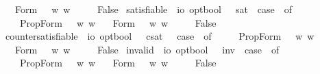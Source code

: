 \begin{isabellebody}
\ \ {\isacharbar}\ Form\ {\isasympsi}\ {\isasymRightarrow}\ {\isasymforall}w{\isachardot}{\isacharparenleft}{\isasympsi}\ w{\isacharparenright}\isanewline
\ \ {\isacharbar}\ {\isacharunderscore}\ {\isasymRightarrow}\ False{\isachardoublequoteclose}\isanewline
{}\isamarkupfalse%
\ satisfiable\ {\isacharcolon}{\isacharcolon}\ {\isachardoublequoteopen}io\ opt{\isasymRightarrow}bool{\isachardoublequoteclose}\ \ \ {\isachardoublequoteopen}{\isacharbrackleft}{\isasymphi}{\isacharbrackright}\isactrlsup s\isactrlsup a\isactrlsup t\ {\isasymequiv}\ case\ {\isasymphi}\ of\ \isanewline
\ \ \ \ PropForm\ {\isasympsi}\ {\isasymRightarrow}\ {\isasymexists}w{\isachardot}{\isacharparenleft}{\isasympsi}\ w{\isacharparenright}\isanewline
\ \ {\isacharbar}\ Form\ {\isasympsi}\ {\isasymRightarrow}\ {\isasymexists}w{\isachardot}{\isacharparenleft}{\isasympsi}\ w{\isacharparenright}\isanewline
\ \ {\isacharbar}\ {\isacharunderscore}\ {\isasymRightarrow}\ False{\isachardoublequoteclose}\isanewline
{}\isamarkupfalse%
\ countersatisfiable\ {\isacharcolon}{\isacharcolon}\ {\isachardoublequoteopen}io\ opt{\isasymRightarrow}bool{\isachardoublequoteclose}\ \ \ {\isachardoublequoteopen}{\isacharbrackleft}{\isasymphi}{\isacharbrackright}\isactrlsup c\isactrlsup s\isactrlsup a\isactrlsup t\ {\isasymequiv}\ \ case\ {\isasymphi}\ of\ \isanewline
\ \ \ \ PropForm\ {\isasympsi}\ {\isasymRightarrow}\ {\isasymexists}w{\isachardot}{\isasymnot}{\isacharparenleft}{\isasympsi}\ w{\isacharparenright}\isanewline
\ \ {\isacharbar}\ Form\ {\isasympsi}\ {\isasymRightarrow}\ {\isasymexists}w{\isachardot}{\isasymnot}{\isacharparenleft}{\isasympsi}\ w{\isacharparenright}\isanewline
\ \ {\isacharbar}\ {\isacharunderscore}\ {\isasymRightarrow}\ False{\isachardoublequoteclose}\isanewline
{}\isamarkupfalse%
\ invalid\ {\isacharcolon}{\isacharcolon}\ {\isachardoublequoteopen}io\ opt{\isasymRightarrow}bool{\isachardoublequoteclose}\ \ \ {\isachardoublequoteopen}{\isacharbrackleft}{\isasymphi}{\isacharbrackright}\isactrlsup i\isactrlsup n\isactrlsup v\ {\isasymequiv}\ case\ {\isasymphi}\ of\ \isanewline
\ \ \ \ PropForm\ {\isasympsi}\ {\isasymRightarrow}\ {\isasymforall}w{\isachardot}{\isasymnot}{\isacharparenleft}{\isasympsi}\ w{\isacharparenright}\isanewline
\ \ {\isacharbar}\ Form\ {\isasympsi}\ {\isasymRightarrow}\ {\isasymforall}w{\isachardot}{\isasymnot}{\isacharparenleft}{\isasympsi}\ w{\isacharparenright}\isanewline
\ \ {\isacharbar}\ {\isacharunderscore}\ {\isasymRightarrow}\ False{\isachardoublequoteclose}%

\end{isabellebody}
